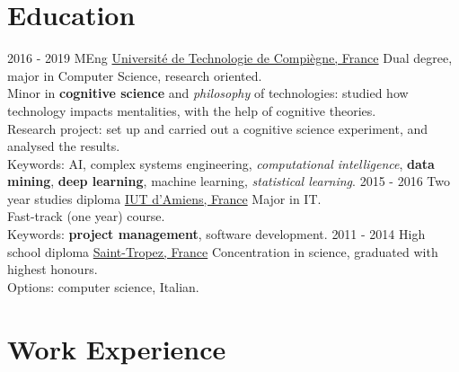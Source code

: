\documentclass[a4paper]{twentysecondcv} %
\begin{document}
\makeprofile %


\section{Education}

\begin{twenty} %
	\twentyitem
    	{2016 - 2019}
        {}
        {MEng}
        {\href{https://www.utc.fr/}{Université de Technologie de Compiègne, France}}
        {}
        {Dual degree, major in Computer Science, research oriented.\\Minor in \textbf{cognitive science} and \textit{philosophy} of technologies: studied how technology impacts mentalities, with the help of cognitive theories.\\Research project: set up and carried out a cognitive science experiment, and analysed the results.\\Keywords: AI, complex systems engineering, \textit{computational intelligence}, \textbf{data mining}, \textbf{deep learning}, machine learning, \textit{statistical learning}.}
	\twentyitem
    	{2015 - 2016}
        {}
        {Two year studies diploma}
        {\href{http://www.iut-amiens.fr/}{IUT d'Amiens, France}}
        {}
        {Major in IT.\\Fast-track (one year) course.\\Keywords: \textbf{project management}, software development.}
	\twentyitem
    	{2011 - 2014}
		{}
        {High school diploma}
        {\href{http://www.lyc-du-golfe-de-saint-tropez.ac-nice.fr/}{Saint-Tropez, France}}
        {}
        {Concentration in science, graduated with highest honours.\\Options: computer science, Italian.}
\end{twenty}


\section{Work Experience}
\end{document}
